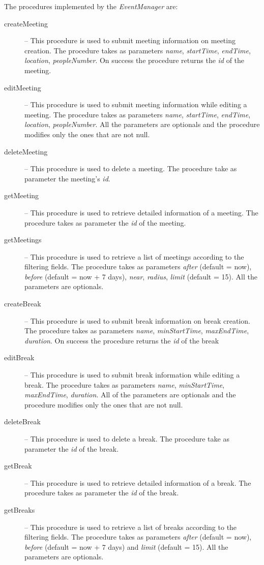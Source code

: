 \documentclass{article}
\begin{document}
	\bigskip
	The procedures implemented by the \textit{EventManager} are:
	\begin{description}
	\item [createMeeting] -- This procedure is used to submit meeting information on meeting creation. The procedure takes as parameters \textit{name}, \textit{startTime}, \textit{endTime}, \textit{location}, \textit{peopleNumber}. On success the procedure returns the \textit{id} of the meeting.
	\item [editMeeting] -- This procedure is used to submit meeting information while editing a meeting. The procedure takes as parameters \textit{name}, \textit{startTime}, \textit{endTime}, \textit{location}, \textit{peopleNumber}. All the parameters are optionals and the procedure modifies only the ones that are not null.
	\item [deleteMeeting] -- This procedure is used to delete a meeting. The procedure take as parameter the meeting's \textit{id}.
	\item [getMeeting] -- This procedure is used to retrieve detailed information of a meeting. The procedure takes as parameter the \textit{id} of the meeting.
	\item [getMeetings] -- This procedure is used to retrieve a list of meetings according to the filtering fields. The procedure takes as parameters \textit{after} (default = now), \textit{before} (default = now + 7 days), \textit{near}, \textit{radius}, \textit{limit} (default = 15). All the parameters are optionals.
	\item [createBreak] -- This procedure is used to submit break information on break creation. The procedure takes as parameters \textit{name}, \textit{minStartTime}, \textit{maxEndTime}, \textit{duration}. On success the procedure returns the \textit{id} of the break
	\item [editBreak] -- This procedure is used to submit break information while editing a break. The procedure takes as parameters \textit{name}, \textit{minStartTime}, \textit{maxEndTime}, \textit{duration}. All of the parameters are optionals and the procedure modifies only the ones that are not null.
	\item [deleteBreak] -- This procedure is used to delete a break. The procedure take as parameter the \textit{id} of the break.
	\item [getBreak] -- This procedure is used to retrieve detailed information of a break. The procedure takes as parameter the \textit{id} of the break.
	\item [getBreaks] -- This procedure is used to retrieve a list of breaks according to the filtering fields. The procedure takes as parameters \textit{after} (default = now), \textit{before} (default = now + 7 days) and \textit{limit} (default = 15). All the parameters are optionals.
	
	\end{description}
\end{document}
